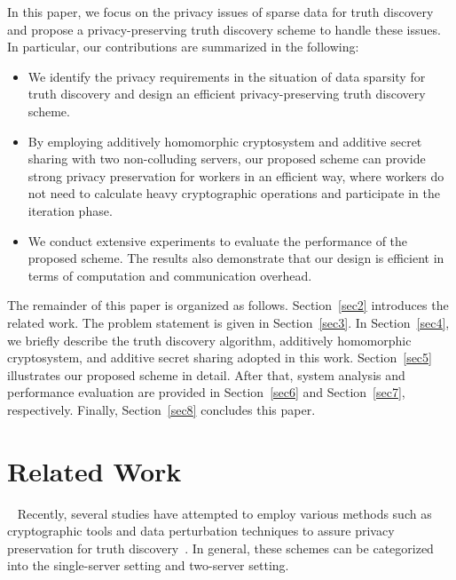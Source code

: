 \documentclass[conference]{IEEEtran}
\begin{document}
In this paper, we focus on the privacy issues of sparse data for truth discovery and propose a privacy-preserving truth discovery scheme to handle these issues.
In particular, our contributions are summarized in the following:
\begin{itemize}
  \item We identify the privacy requirements in the situation of data sparsity for truth discovery and design an efficient privacy-preserving truth discovery scheme. 
  \item By employing additively homomorphic cryptosystem and additive secret sharing with two non-colluding servers, our proposed scheme can provide strong privacy preservation for workers in an efficient way, where workers do not need to calculate heavy cryptographic operations and participate in the iteration phase.
  \item We conduct extensive experiments to evaluate the performance of the proposed scheme. The results also demonstrate that our design is efficient in terms of computation and communication overhead.
\end{itemize}

The remainder of this paper is organized as follows.
Section~\ref{sec2} introduces the related work.
The problem statement is given in Section~\ref{sec3}.
In Section~\ref{sec4}, we briefly describe the truth discovery algorithm, additively homomorphic cryptosystem, and additive secret sharing adopted in this work.
Section~\ref{sec5} illustrates our proposed scheme in detail.
After that, system analysis and performance evaluation are provided in Section~\ref{sec6} and Section~\ref{sec7}, respectively.
Finally, Section~\ref{sec8} concludes this paper.

\section{Related Work}~\label{sec2}
Recently, several studies have attempted to employ various methods such as cryptographic tools and data perturbation techniques to assure privacy preservation for truth discovery~\cite{miao_cloud-enabled_2015,xu_efficient_2019,miao_lightweight_2017,zhang_reliable_2019,xue_inpptd_2020,tang_achieving_2021}.
In general, these schemes can be categorized into the single-server setting and two-server setting.
\end{document}
